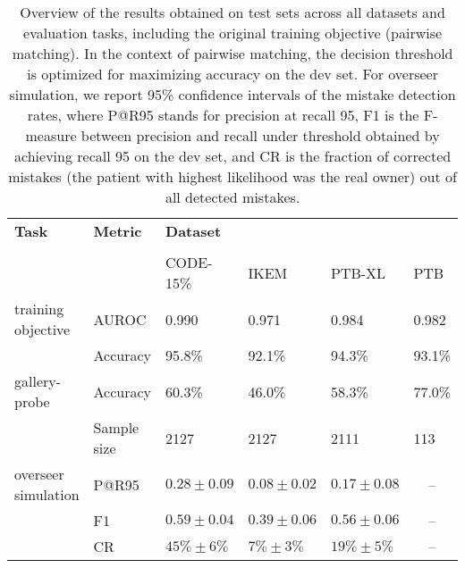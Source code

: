 \documentclass[preprint,12pt]{elsarticle}
\begin{document}
\begin{table}[h]
    \footnotesize
    \centering
    \begin{tabular}{llllll}
        \toprule
        \textbf{Task} & \textbf{Metric} & \textbf{Dataset} & \textbf{} & \textbf{} & \textbf{}\\ \\
        \textbf{} & \textbf{} & {CODE-15\%} & {IKEM} & {PTB-XL} & {PTB}\\
        \midrule \midrule
        training objective & {AUROC} & 0.990 & 0.971 & 0.984 & 0.982 \\
        \textit{} & {Accuracy} & 95.8\% & 92.1\% & 94.3\% & 93.1\% \\
        \midrule
        gallery-probe & {Accuracy} & 60.3\% & 46.0\% & 58.3\% & 77.0\% \\
        & Sample size & 2127 & 2127 & 2111 & 113 \\
        \midrule
        overseer simulation & {P@R95} & $0.28 \pm 0.09$ & $0.08 \pm 0.02$ & $0.17 \pm 0.08$ & \multicolumn{1}{c}{--} \\
        \textit{} & {F1} & $0.59 \pm 0.04$ & $0.39 \pm 0.06$ & $0.56 \pm 0.06$ & \multicolumn{1}{c}{--} \\
        \textit{} & {CR} & $45\% \pm 6\%$ & $7\% \pm 3\%$ & $19\% \pm 5\%$ & \multicolumn{1}{c}{--} \\
        \bottomrule
    \end{tabular}
    \caption{Overview of the results obtained on test sets across all datasets and evaluation tasks, including the original training objective (pairwise matching). In the context of pairwise matching, the decision threshold is optimized for maximizing accuracy on the dev set. For overseer simulation, we report 95\% confidence intervals of the mistake detection rates, where P@R95 stands for precision at recall 95, F1 is the F-measure between precision and recall under threshold obtained by achieving recall 95 on the dev set, and CR is the fraction of corrected mistakes (the patient with highest likelihood was the real owner) out of all detected mistakes.}
    \label{tab:final-results}
\end{table}
\end{document}
